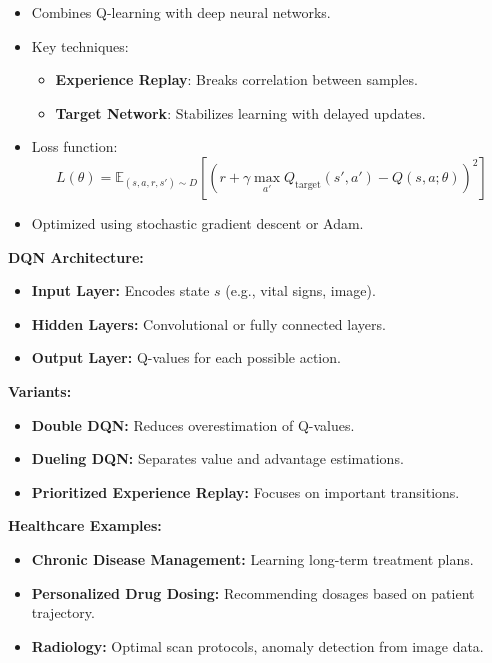 \documentclass[12pt]{article}
\begin{document}
\begin{itemize}
    \item Combines Q-learning with deep neural networks.
    \item Key techniques:
    \begin{itemize}
        \item \textbf{Experience Replay}: Breaks correlation between samples.
        \item \textbf{Target Network}: Stabilizes learning with delayed updates.
    \end{itemize}
    \item Loss function:
    \[
    L(\theta) = \mathbb{E}_{(s,a,r,s') \sim D} \left[ \left( r + \gamma \max_{a'} Q_{\text{target}}(s',a') - Q(s,a;\theta) \right)^2 \right]
    \]
    \item Optimized using stochastic gradient descent or Adam.
\end{itemize}

\textbf{DQN Architecture:}
\begin{itemize}
    \item \textbf{Input Layer:} Encodes state $s$ (e.g., vital signs, image).
    \item \textbf{Hidden Layers:} Convolutional or fully connected layers.
    \item \textbf{Output Layer:} Q-values for each possible action.
\end{itemize}

\textbf{Variants:}
\begin{itemize}
    \item \textbf{Double DQN:} Reduces overestimation of Q-values.
    \item \textbf{Dueling DQN:} Separates value and advantage estimations.
    \item \textbf{Prioritized Experience Replay:} Focuses on important transitions.
\end{itemize}

\textbf{Healthcare Examples:}
\begin{itemize}
    \item \textbf{Chronic Disease Management:} Learning long-term treatment plans.
    \item \textbf{Personalized Drug Dosing:} Recommending dosages based on patient trajectory.
    \item \textbf{Radiology:} Optimal scan protocols, anomaly detection from image data.
\end{itemize}
\end{document}
